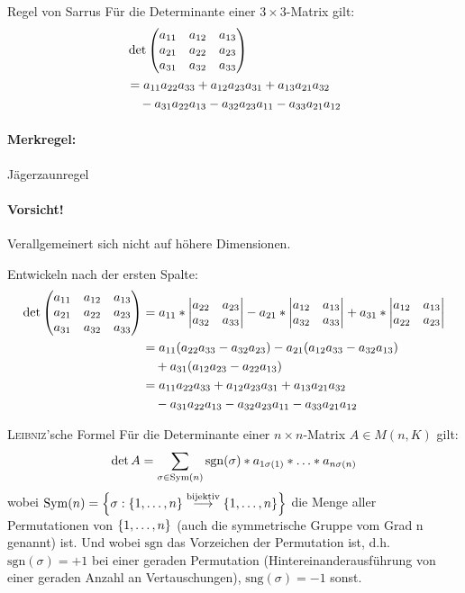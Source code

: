 \begin{satz}{Regel von Sarrus}
	Für die Determinante einer $3\times3$-Matrix gilt:
	\begin{align*}
		&\det\matrix{
		\ma{11} & \ma{12} & \ma{13}\\
		\ma{21} & \ma{22} & \ma{23}\\
		\ma{31} & \ma{32} & \ma{33}
		}\\
		&=\ma{11}\ma{22}\ma{33}+\ma{12}\ma{23}\ma{31}+\ma{13}\ma{21}\ma{32}\\
		&\quad-\ma{31}\ma{22}\ma{13}-\ma{32}\ma{23}\ma{11}-\ma{33}\ma{21}\ma{12}
	\end{align*}
\end{satz}
\paragraph{Merkregel:} \glqq Jägerzaunregel\grqq

\paragraph{Vorsicht!} Verallgemeinert sich nicht auf höhere Dimensionen.

\beweis
Entwickeln nach der ersten Spalte:
\begin{align*}
	\det\matrix{
	\ma{11} & \ma{12} & \ma{13}\\
	\ma{21} & \ma{22} & \ma{23}\\
	\ma{31} & \ma{32} & \ma{33}
	}&=\ma{11}*\detmatrix{\ma{22} & \ma{23}\\\ma{32} & \ma{33}}
	-\ma{21}*\detmatrix{\ma{12} & \ma{13}\\\ma{32} & \ma{33}}
	+\ma{31}*\detmatrix{\ma{12} & \ma{13}\\\ma{22} & \ma{23}}\\
	&=\ma{11}(\ma{22}\ma{33}-\ma{32}\ma{23})-\ma{21}(\ma{12}\ma{33}-\ma{32}\ma{13})\\
	&\quad+\ma{31}(\ma{12}\ma{23}-\ma{22}\ma{13})\\
	&=\ma{11}\ma{22}\ma{33}+\ma{12}\ma{23}\ma{31}+\ma{13}\ma{21}\ma{32}\\
	&\quad-\ma{31}\ma{22}\ma{13}-\ma{32}\ma{23}\ma{11}-\ma{33}\ma{21}\ma{12}
\end{align*}


\begin{satz}{\textsc{Leibniz}'sche Formel}
	Für die Determinante einer $n\times n$-Matrix $A\in M(n,K)$ gilt:
	\begin{equation*}
		\operatorname{det} A=\sum_{\sigma\in \mathrm{Sym}(n)}\mathrm{sgn}(\sigma)*a_{1\sigma(1)}*\ldots*a_{n\sigma(n)}
	\end{equation*}
	wobei $\mathrm{Sym}(n)=
	\left\{ 
		\sigma:
		\left\{ 1,\ldots,n \right\}
			\overset{\text{bijektiv}}{\longrightarrow}
		\left\{ 1,\ldots,n \right\}
	 \right\}$ die Menge aller Permutationen von $\left\{ 1,\ldots,n \right\}$ (auch die symmetrische Gruppe vom Grad n genannt) ist. Und wobei $\mathrm{sgn}$ das Vorzeichen der Permutation ist, d.h. $\mathrm{sgn}(\sigma)=+1$ bei einer geraden Permutation (Hintereinanderausführung von einer geraden Anzahl an Vertauschungen), $\mathrm{sng}(\sigma)=-1$ sonst.
\end{satz}


